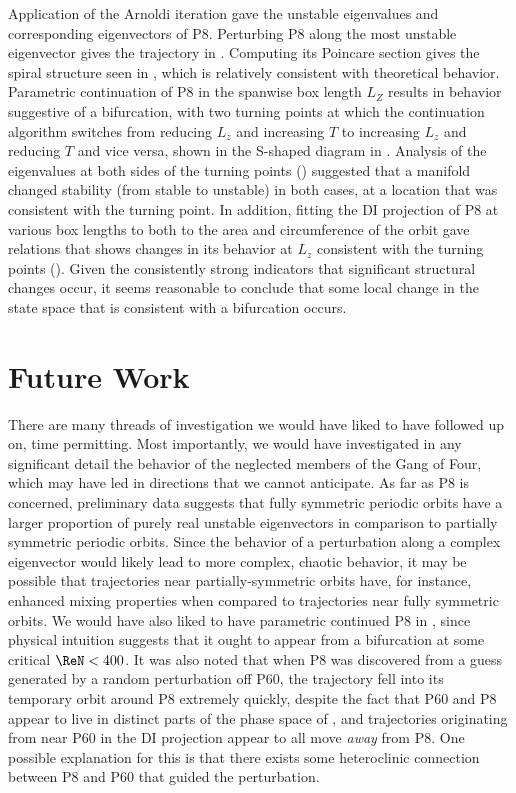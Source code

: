 Application of the Arnoldi iteration gave the unstable eigenvalues and corresponding eigenvectors of P8. Perturbing P8 along the most unstable eigenvector gives the trajectory in . Computing its Poincare section gives the spiral structure seen in , which is relatively consistent with theoretical behavior. Parametric continuation of P8 in the spanwise box length $L_Z$ results in behavior suggestive of a bifurcation, with two turning points at which the continuation algorithm switches from reducing $L_z$ and increasing $T$ to increasing $L_z$ and reducing $T$ and vice versa, shown in the S-shaped diagram in . Analysis of the eigenvalues at both sides of the turning points () suggested that a manifold changed stability (from stable to unstable) in both cases, at a location that was consistent with the turning point.  In addition, fitting the DI projection of P8 at various box lengths to both to the area and circumference of the orbit gave relations that shows changes in its behavior at $L_z$ consistent with the turning points (). Given the consistently strong indicators that significant structural changes occur, it seems reasonable to conclude that some local change in the state space that is consistent with a bifurcation occurs.\\


\section{Future Work}

There are many threads of investigation we would have liked to have followed up on, time permitting. Most importantly, we would have investigated in any significant detail the behavior of the neglected members of the Gang of Four, which may have led in directions that we cannot anticipate. As far as P8 is concerned, preliminary data suggests that fully symmetric periodic orbits have a larger proportion of purely real unstable eigenvectors in comparison to partially symmetric periodic orbits. Since the behavior of a perturbation along a complex eigenvector would likely lead to more complex, chaotic behavior, it may be possible that trajectories near partially-symmetric orbits have, for instance, enhanced mixing properties when compared to trajectories near fully symmetric orbits. We would have also liked to have parametric continued P8 in \ReN, since physical intuition suggests that it ought to appear from a bifurcation at some critical $\ReN < 400$.  It was also noted that when P8 was discovered from a guess generated by a random perturbation off P60, the trajectory fell into its temporary orbit around P8 extremely quickly, despite the fact that P60 and P8 appear to live in distinct parts of the phase space of , and trajectories originating from near P60 in the DI projection appear to all move \emph{away} from P8. One possible explanation for this is that there exists some heteroclinic connection between P8 and P60 that guided the perturbation.  
